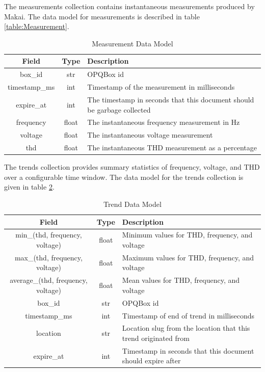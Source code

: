 The measurements collection contains instantaneous measurements produced by Makai. The data model for measurements is described in table \ref{table:Measurement}.

\begin{table}[H]
	\centering
	\caption{Measurement Data Model}
	\begin{tabular}{|c|c|p{8cm}|}
		\hline 
		Field & Type & Description \\ 
		\hline
		box\_id & str & OPQBox id \\
		\hline
		timestamp\_ms & int & Timestamp of the measurement in milliseconds \\
		\hline
		expire\_at & int & The timestamp in seconds that this document should be garbage collected \\
		\hline
		frequency & float & The instantaneous frequency measurement in Hz \\
		\hline
		voltage & float & The instantaneous voltage measurement \\
		\hline
		thd & float & The instantaneous THD measurement as a percentage \\
		\hline
	\end{tabular} 
	\label{table:Measurements}
\end{table}

The trends collection provides summary statistics of frequency, voltage, and THD over a configurable time window. The data model for the trends collection is given in table \ref{table:Trends}.

\begin{table}[H]
	\centering
	\caption{Trend Data Model}
	\begin{tabular}{|c|c|p{8cm}|}
		\hline 
		Field & Type & Description \\ 
		\hline
		min\_(thd, frequency, voltage) & float & Minimum values for THD, frequency, and voltage \\
		\hline
		max\_(thd, frequency, voltage) & float & Maximum values for THD, frequency, and voltage \\
		\hline
		average\_(thd, frequency, voltage) & float & Mean values for THD, frequency, and voltage \\
		\hline
		box\_id & str & OPQBox id \\
		\hline
		timestamp\_ms & int & Timestamp of end of trend in milliseconds \\
		\hline
		location & str & Location slug from the location that this trend originated from \\
		\hline
		expire\_at & int & Timestamp in seconds that this document should expire after \\
		\hline
	\end{tabular} 
	\label{table:Trends}
\end{table}

